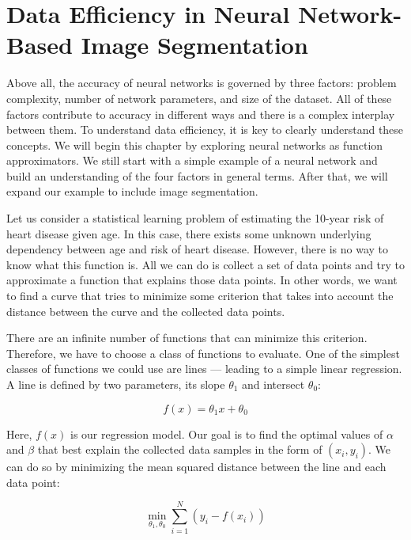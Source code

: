 
\chapter{Data Efficiency in Neural Network-Based Image Segmentation}
\label{chap:data-efficiency}

Above all, the accuracy of neural networks is governed by three factors: problem complexity, number of network parameters, and size of the dataset. All of these factors contribute to accuracy in different ways and there is a complex interplay between them. To understand data efficiency, it is key to clearly understand these concepts. We will begin this chapter by exploring neural networks as function approximators. We still start with a simple example of a neural network and build an understanding of the four factors in general terms. After that, we will expand our example to include image segmentation.

Let us consider a statistical learning problem of estimating the 10-year risk of heart disease given age. In this case, there exists some unknown underlying dependency between age and risk of heart disease. However, there is no way to know what this function is. All we can do is collect a set of data points and try to approximate a function that explains those data points. In other words, we want to find a curve that tries to minimize some criterion that takes into account the distance between the curve and the collected data points.

There are an infinite number of functions that can minimize this criterion. Therefore, we have to choose a class of functions to evaluate. One of the simplest classes of functions we could use are lines --- leading to a simple linear regression. A line is defined by two parameters, its slope $\theta_1$ and intersect $\theta_0$:

\begin{equation}
	f(x) = \theta_1 x + \theta_0
\end{equation}

Here, $f(x)$ is our regression model. Our goal is to find the optimal values of $\alpha$ and $\beta$ that best explain the collected data samples in the form of $(x_i, y_i)$. We can do so by minimizing the mean squared distance between the line and each data point:

\begin{equation}
	\min_{\theta_1, \theta_0} \sum_{i=1}^N (y_i - f(x_i))
\end{equation}

